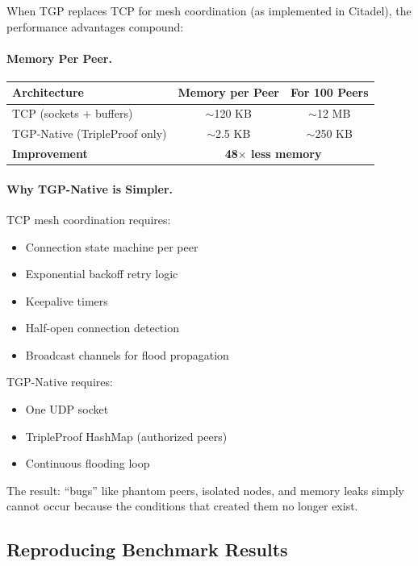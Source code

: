 When TGP replaces TCP for mesh coordination (as implemented in Citadel), the performance advantages compound:

\paragraph{Memory Per Peer.}
\begin{center}
\begin{tabular}{lcc}
\toprule
Architecture & Memory per Peer & For 100 Peers \\
\midrule
TCP (sockets + buffers) & $\sim$120 KB & $\sim$12 MB \\
TGP-Native (TripleProof only) & $\sim$2.5 KB & $\sim$250 KB \\
\midrule
\textbf{Improvement} & \multicolumn{2}{c}{\textbf{48$\times$ less memory}} \\
\bottomrule
\end{tabular}
\end{center}

\paragraph{Why TGP-Native is Simpler.}
TCP mesh coordination requires:
\begin{itemize}
    \item Connection state machine per peer
    \item Exponential backoff retry logic
    \item Keepalive timers
    \item Half-open connection detection
    \item Broadcast channels for flood propagation
\end{itemize}

TGP-Native requires:
\begin{itemize}
    \item One UDP socket
    \item TripleProof HashMap (authorized peers)
    \item Continuous flooding loop
\end{itemize}

The result: ``bugs'' like phantom peers, isolated nodes, and memory leaks simply cannot occur because the conditions that created them no longer exist.

\subsection{Reproducing Benchmark Results}

